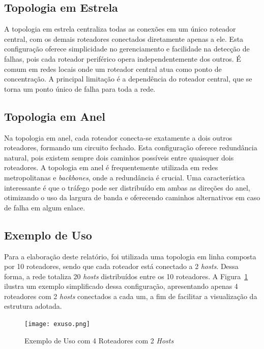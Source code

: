 \documentclass[12pt,a4paper]{report}
\begin{document}
\subsection{Topologia em Estrela}

A topologia em estrela centraliza todas as conexões em um único roteador central, com os demais roteadores conectados diretamente apenas a ele. Esta configuração oferece simplicidade no gerenciamento e facilidade na detecção de falhas, pois cada roteador periférico opera independentemente dos outros. É comum em redes locais onde um roteador central atua como ponto de concentração. A principal limitação é a dependência do roteador central, que se torna um ponto único de falha para toda a rede.

\subsection{Topologia em Anel}

Na topologia em anel, cada roteador conecta-se exatamente a dois outros roteadores, formando um circuito fechado. Esta configuração oferece redundância natural, pois existem sempre dois caminhos possíveis entre quaisquer dois roteadores. A topologia em anel é frequentemente utilizada em redes metropolitanas e \textit{backbones}, onde a redundância é crucial. Uma característica interessante é que o tráfego pode ser distribuído em ambas as direções do anel, otimizando o uso da largura de banda e oferecendo caminhos alternativos em caso de falha em algum enlace.

\subsection{Exemplo de Uso}
Para a elaboração deste relatório, foi utilizada uma topologia em linha composta por 10 roteadores, sendo que cada roteador está conectado a 2 \textit{hosts}. Dessa forma, a rede totaliza 20 \textit{hosts} distribuídos entre os 10 roteadores. A Figura~\ref{fig:uso} ilustra um exemplo simplificado dessa configuração, apresentando apenas 4 roteadores com 2 \textit{hosts} conectados a cada um, a fim de facilitar a visualização da estrutura adotada.

\begin{figure}[h!]
    \centering
    \texttt{[image: exuso.png]}
    \caption{Exemplo de Uso com 4 Roteadores com 2 \textit{Hosts}}
    \label{fig:uso}
\end{figure}
\end{document}
